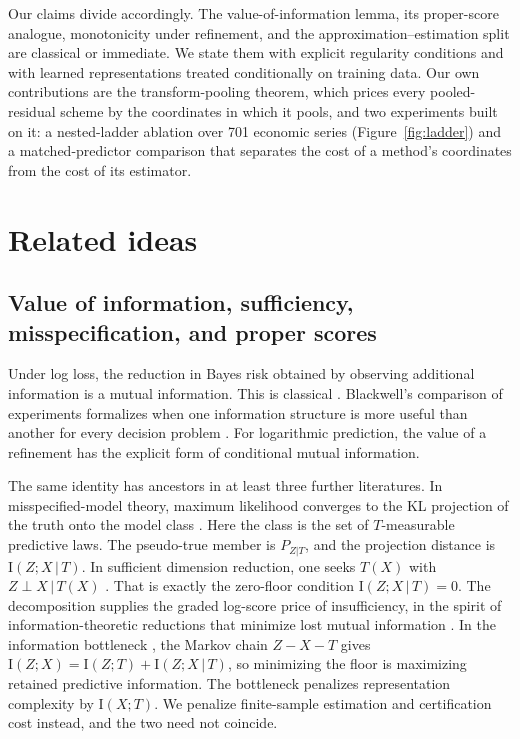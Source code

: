 \documentclass[11pt]{article}
\theoremstyle{remark}
\newcommand{\I}{\mathrm{I}}
\newcommand{\given}{\,|\,}
\begin{document}
Our claims divide accordingly. The value-of-information lemma, its proper-score
analogue, monotonicity under refinement, and the approximation--estimation split are classical
or immediate. We state them with explicit regularity conditions and with learned
representations
treated conditionally on training data. Our own contributions are the transform-pooling
theorem, which prices every pooled-residual scheme by the coordinates in which it pools, and
two experiments built on it: a nested-ladder ablation over 701 economic series
(Figure~\ref{fig:ladder}) and a matched-predictor comparison that separates the cost of a
method's coordinates from the cost of its estimator.

\section{Related ideas}\label{sec:related}

\subsection{Value of information, sufficiency, misspecification, and proper scores}

Under log loss, the reduction in Bayes risk obtained by observing additional information is a
mutual information. This is classical \citep{lindley1956measure,degroot1962uncertainty}.
Blackwell's comparison of experiments formalizes when one information structure is more useful
than another for every decision problem \citep{blackwell1953equivalent}. For logarithmic
prediction, the value of a refinement has the explicit form of conditional mutual
information.

The same identity has ancestors in at least three further literatures. In misspecified-model
theory, maximum likelihood converges to the KL projection of the truth onto the model class
\citep{white1982maximum}. Here the class is the set of $T$-measurable predictive laws. The
pseudo-true member is $P_{Z|T}$, and the projection distance is $\I(Z;X\given T)$. In
sufficient dimension reduction, one seeks $T(X)$ with $Z\perp X\given T(X)$
\citep{li1991sliced,fukumizu2004dimensionality}. That is exactly the zero-floor condition
$\I(Z;X\given T)=0$. The decomposition supplies the graded log-score price of
insufficiency, in the spirit of information-theoretic reductions that minimize lost mutual
information \citep{globerson2003sufficient}. In the information bottleneck
\citep{tishby1999information}, the Markov chain $Z-X-T$ gives
$\I(Z;X)=\I(Z;T)+\I(Z;X\given T)$, so minimizing the floor is maximizing retained
predictive information. The bottleneck penalizes representation complexity by $\I(X;T)$. We
penalize finite-sample estimation and certification cost instead, and the two need not
coincide.
\end{document}
